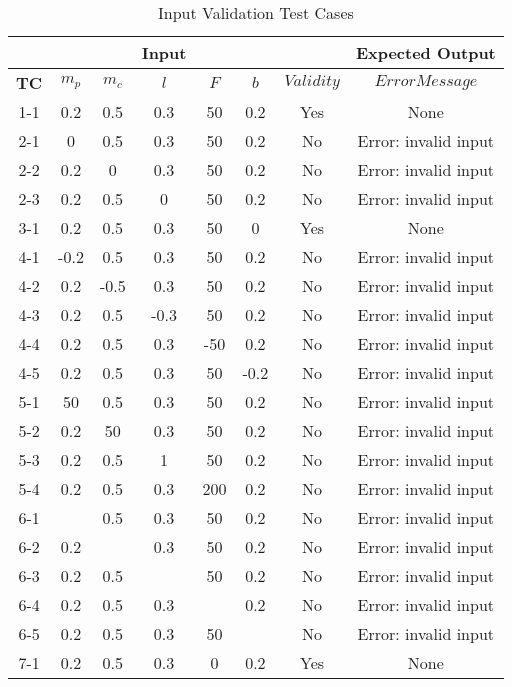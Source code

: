 \documentclass[12pt, titlepage]{article}
\begin{document}
\begin{table}[h!]
\centering
\caption{Input Validation Test Cases} \label{tbl_inputValidation}
\vspace*{2mm}
 \begin{tabular}{|c|c c c c c| c c|} 
 \hline
   & &&\textbf{Input}&& &  &\textbf{Expected Output} \\ \hline
\textbf{TC} &   $m_p$ & $m_c$ & $l$ & $F$ & $b$  &   $Validity$   &   $Error Message$ \\ \hline
1-1 &0.2 & 0.5& 0.3& 50& 0.2 & Yes & None\\
 \hline
2-1 &0 & 0.5& 0.3& 50& 0.2 & No & Error: invalid input  \\
 \hline
2-2 &0.2 & 0& 0.3& 50& 0.2& No & Error: invalid input\\
 \hline
2-3 &0.2 & 0.5& 0& 50& 0.2 &  No & Error: invalid input\\
 \hline
3-1 &0.2 & 0.5& 0.3& 50& 0 & Yes & None\\
 \hline
 4-1 &-0.2 & 0.5& 0.3& 50& 0.2&  No & Error: invalid input\\
 \hline
 4-2 &0.2 & -0.5& 0.3& 50& 0.2&   No & Error: invalid input\\
 \hline
 4-3 &0.2 & 0.5& -0.3& 50& 0.2&   No & Error: invalid input\\
 \hline
 4-4 &0.2 & 0.5& 0.3& -50& 0.2 &   No & Error: invalid input\\
 \hline
 4-5 &0.2 & 0.5& 0.3& 50& -0.2 &   No & Error: invalid input\\
 \hline
 5-1 & 50& 0.5& 0.3& 50& 0.2 & No & Error: invalid input\\
 \hline
5-2 & 0.2& 50& 0.3& 50& 0.2 & No & Error: invalid input\\
 \hline
5-3 & 0.2& 0.5& 1& 50& 0.2& No & Error: invalid input \\
 \hline
5-4 & 0.2& 0.5& 0.3& 200& 0.2 & No & Error: invalid input\\
 \hline
6-1 & & 0.5& 0.3& 50& 0.2 & No & Error: invalid input \\
  \hline
6-2 &0.2 & &0.3 & 50& 0.2 & No & Error: invalid input\\  
\hline
 6-3 & 0.2& 0.5& & 50& 0.2 & No & Error: invalid input \\
  \hline
  6-4 & 0.2& 0.5& 0.3& & 0.2 & No & Error: invalid input\\
  \hline
   6-5 & 0.2& 0.5& 0.3& 50&  & No & Error: invalid input \\
  \hline
 7-1 &0.2 & 0.5& 0.3& 0& 0.2& Yes & None\\
 \hline
\end{tabular}

\end{table}		
\end{document}
